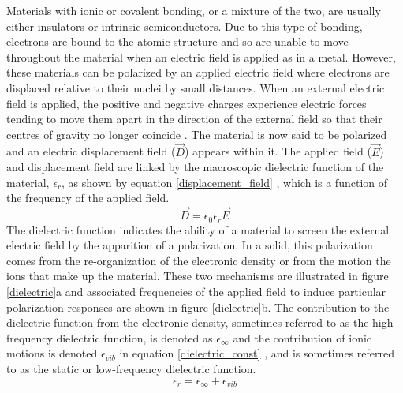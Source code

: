 Materials with ionic or covalent bonding, or a mixture of the two, are usually either insulators or intrinsic semiconductors. Due to this type of bonding, electrons are bound to the atomic structure and so are unable to move throughout the material when an electric field is applied as in a metal. However, these materials can be polarized by an applied electric field where electrons are displaced relative to their nuclei by small distances. When an external electric field is applied, the positive and negative charges experience electric forces tending to move them apart in the direction of the external field so that their centres of gravity no longer coincide \cite{dielectric2}. The material is now said to be polarized and an electric displacement field ($\vec{D}$) appears within it. The applied field ($\vec{E}$) and displacement field are linked by the macroscopic dielectric function of the material, $\epsilon_r$, as shown by equation \ref{displacement_field} \cite{dielectric_const1}, which is a function of the frequency of the applied field.
\begin{equation} \label{displacement_field}
\vec{D} = \epsilon_0 \epsilon_r \vec{E}
\end{equation}
The dielectric function indicates the ability of a material to screen the external electric field by the apparition of a polarization. In a solid, this polarization comes from the re-organization of the electronic density or from the motion the ions that make up the material. These two mechanisms are illustrated in figure \ref{dielectric}a and associated frequencies of the applied field to induce particular polarization responses are shown in figure \ref{dielectric}b. The contribution to the dielectric function from the electronic density, sometimes referred to as the high-frequency dielectric function, is denoted as $\epsilon_{\infty}$ and the contribution of ionic motions is denoted $\epsilon_{vib}$ in equation \ref{dielectric_const} \cite{dielectric_const1}, and is sometimes referred to as the static or low-frequency dielectric function.
\begin{equation} \label{dielectric_const}
\epsilon_{r} = \epsilon_{\infty} + \epsilon_{vib}
\end{equation}


